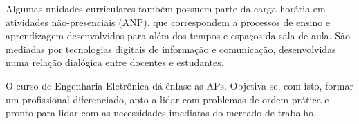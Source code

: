 
Algumas unidades curriculares também possuem parte da carga horária  em atividades não-presenciais (ANP), que correspondem a processos de ensino e aprendizagem desenvolvidos para além dos tempos e espaços da sala de aula. São mediadas por tecnologias digitais de informação e comunicação, desenvolvidas numa relação dialógica entre docentes e estudantes.


O curso de Engenharia Eletrônica dá ênfase as APs. Objetiva-se, com isto, formar um profissional diferenciado, apto a lidar com problemas de ordem prática e pronto para lidar com as necessidades imediatas do mercado de trabalho.







